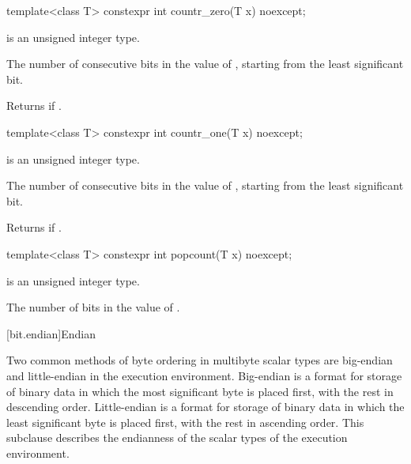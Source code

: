 \begin{itemdecl}
template<class T>
  constexpr int countr_zero(T x) noexcept;
\end{itemdecl}

%
\begin{itemdescr}
\pnum
\constraints
{} is an unsigned integer type.

\pnum
\returns
The number of consecutive  bits in the value of ,
starting from the least significant bit.
\begin{note}
Returns  if .
\end{note}
\end{itemdescr}

\begin{itemdecl}
template<class T>
  constexpr int countr_one(T x) noexcept;
\end{itemdecl}

%
\begin{itemdescr}
\pnum
\constraints
{} is an unsigned integer type.

\pnum
\returns
The number of consecutive  bits in the value of ,
starting from the least significant bit.
\begin{note}
Returns  if .
\end{note}
\end{itemdescr}

\begin{itemdecl}
template<class T>
  constexpr int popcount(T x) noexcept;
\end{itemdecl}

%
\begin{itemdescr}
\pnum
\constraints
{} is an unsigned integer type.

\pnum
\returns
The number of  bits in the value of .
\end{itemdescr}

[bit.endian]{Endian}

\pnum
Two common methods of byte ordering in multibyte scalar types are big-endian
and little-endian in the execution environment. Big-endian is a format for
storage of binary data in which the most significant byte is placed first,
with the rest in descending order. Little-endian is a format for storage of
binary data in which the least significant byte is placed first, with the rest
in ascending order. This subclause describes the endianness of the scalar types
of the execution environment.

